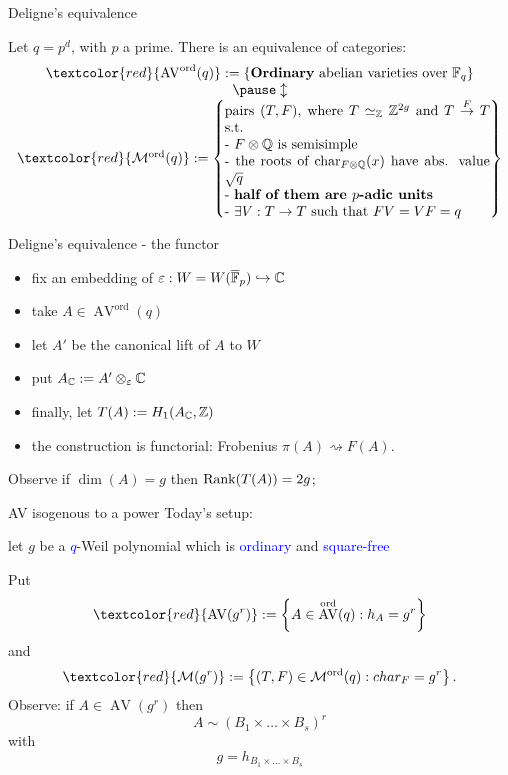 \documentclass[usenames,dvipsnames]{beamer}
\DeclareMathOperator{\AV}{AV}
\newcommand{\AVord}[1]{\AV^{\text{ord}}({#1})}
\newcommand{\Modord}[1]{\cM^{\text{ord}}({#1})}
\newcommand{\red}[1]{\textcolor{red}{#1}}
\newcommand{\blue}[1]{\textcolor{blue}{#1}}
\renewcommand{\char}{char}
\begin{document}
\begin{frame}{ Deligne's equivalence }
\begin{theorem}[Deligne '69]
Let $q=p^d$, with $p$ a prime. There is an equivalence of categories:
\[\begin{array}{cc}
\red{\AVord{q}}:=\set{\text{\textbf{Ordinary} abelian varieties over $\F_q$}}\\
\pause \updownarrow\\
\red{\Modord{q}}:=\set{\parbox[p]{19em}{pairs $(T,F)$, where $T\simeq_\Z \Z^{2g}$ and $T\overset{F}{\to} T$ s.t.\\
- $F\otimes \Q$ is semisimple\\
- the roots of $\Char_{F\otimes\Q}(x)$ have abs. value $\sqrt{q}$\\
- \textbf{half of them are $p$-adic units}\\
- $\exists V:T\to T$ such that $FV=VF=q$
}}
\end{array}\]
\end{theorem}
\end{frame}

\begin{frame}{ Deligne's equivalence - the functor }
 \begin{itemize}
  \item fix an embedding of $\varepsilon:W=W(\overline{\mathbb{F}}_p)\hookrightarrow \mathbb{C}$
  \item take $A\in \AVord{q}$
  \item let $A'$ be the canonical lift of $A$ to $W$
  \item put $A_{\mathbb{C}}:=A'\otimes_\varepsilon \mathbb{C}$
  \item finally, let $T(A):=H_1(A_{\mathbb{C}},\mathbb{Z})$
  \item the construction is functorial: Frobenius $\pi(A)\rightsquigarrow F(A)$.
 \end{itemize}

 \pause Observe if $\dim(A)=g$ then $\operatorname{Rank}(T(A))=2g$;
  
\end{frame}

\begin{frame}{AV isogenous to a power }
Today's setup:
\pause
\begin{center}
let \textbf{$g$} be a \blue{$q$}-Weil polynomial which is \blue{ordinary} and \blue{square-free} 
\end{center}
\pause Put 
\[\red{\AV(g^r)}:=\set{ A \in \AVord{q} : h_A = g^r }\]
\pause
and
\[\red{\cM(g^r)}:=\set{ (T,F) \in \Modord{q} : \char_F = g^r }.\]
\pause
Observe: if $A\in \AV(g^r)$ then
\[ A \sim (B_1\times \ldots \times B_s)^r \]
with
\[ g=h_{B_1\times \ldots \times B_s} \]
\end{frame}
\end{document}

